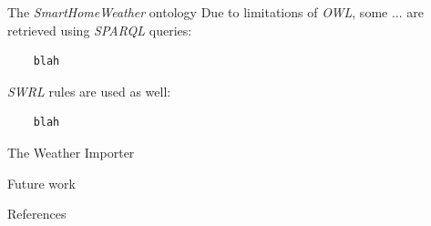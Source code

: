 \documentclass[final,hyperref={pdfpagelabels=true}]{beamer}
\newenvironment{postit}
{\begin{beamercolorbox}[sep=1em,wd=7cm]{postit}}
{\end{beamercolorbox}}
\begin{document}
\begin{frame}[fragile]
\begin{columns}[t]
\begin{column}{.45\textwidth}
\begin{block}{The \emph{SmartHomeWeather} ontology}
	Due to limitations of \emph{OWL}, some ... are retrieved using \emph{SPARQL} queries: %

	\begin{lstlisting}
	blah
	\end{lstlisting}

	\emph{SWRL} rules are used as well:

	\begin{lstlisting}
	blah
        \end{lstlisting}
      \end{block}

      \begin{block}{The Weather Importer}
	\lipsum[6]
      \end{block}

      \begin{block}{Future work}
	\lipsum[7]
      \end{block}

      \begin{block}{References}

      \end{block}
    \end{column}
  \end{columns}

  
\end{frame}
\end{document}
